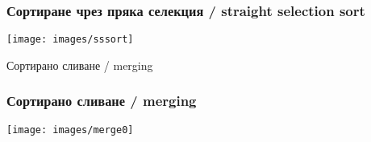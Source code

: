 \documentclass{beamer}
\begin{document}
\begin{frame}[fragile]
\frametitle{Сортиране чрез пряка селекция / straight selection sort}


\texttt{[image: images/sssort]} 

\end{frame}




\begin{frame}
\centerline{Сортирано сливане / merging}
\end{frame}



\begin{frame}[fragile]
\frametitle{Сортирано сливане / merging}


\texttt{[image: images/merge0]} 

\end{frame}
\end{document}
